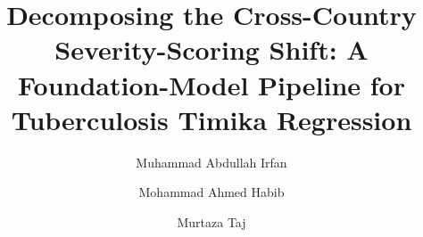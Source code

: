 \documentclass[runningheads]{llncs}
\begin{document}
\title{Decomposing the Cross-Country Severity-Scoring Shift: A Foundation-Model Pipeline for Tuberculosis Timika Regression}


\author{Muhammad Abdullah Irfan \and
Mohammad Ahmed Habib \and
Murtaza Taj}



\maketitle
\end{document}
